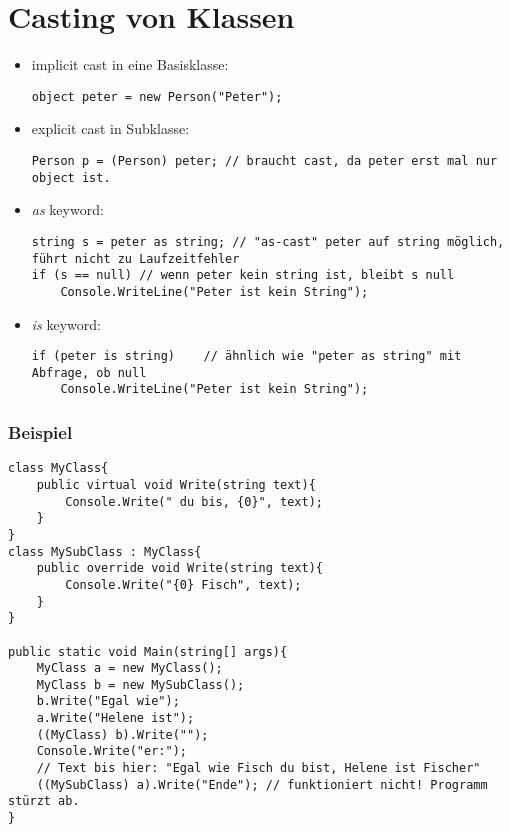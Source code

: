 \section{Casting von Klassen}
\begin{itemize}
\item implicit cast in eine Basisklasse:
\begin{lstlisting}[language={[Sharp]C}]
object peter = new Person("Peter");
\end{lstlisting}
\item explicit cast in Subklasse:
\begin{lstlisting}[language={[Sharp]C}]
Person p = (Person) peter; // braucht cast, da peter erst mal nur object ist.
\end{lstlisting} 
\item \emph{as} keyword: 
\begin{lstlisting}[language={[Sharp]C}]
string s = peter as string;	// "as-cast" peter auf string möglich, führt nicht zu Laufzeitfehler
if (s == null) // wenn peter kein string ist, bleibt s null
	Console.WriteLine("Peter ist kein String");
\end{lstlisting}
\item \emph{is} keyword: 
\begin{lstlisting}[language={[Sharp]C}]
if (peter is string)	// ähnlich wie "peter as string" mit Abfrage, ob null
	Console.WriteLine("Peter ist kein String");
\end{lstlisting}
\end{itemize}
\subsubsection*{Beispiel}
\begin{lstlisting}[language={[Sharp]C}]
class MyClass{
	public virtual void Write(string text){
		Console.Write(" du bis, {0}", text);
	}
}
class MySubClass : MyClass{
	public override void Write(string text){
		Console.Write("{0} Fisch", text);
	}
}

public static void Main(string[] args){
	MyClass a = new MyClass();
	MyClass b = new MySubClass();
	b.Write("Egal wie");
	a.Write("Helene ist");
	((MyClass) b).Write("");
	Console.Write("er:");
	// Text bis hier: "Egal wie Fisch du bist, Helene ist Fischer"
	((MySubClass) a).Write("Ende");	// funktioniert nicht! Programm stürzt ab.
}
\end{lstlisting}

